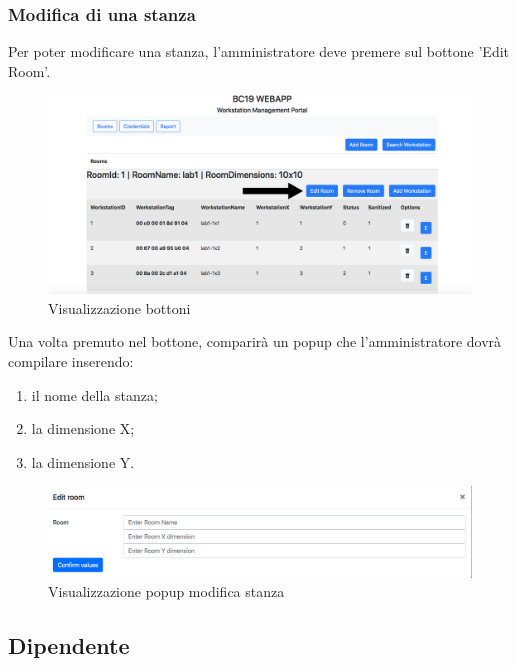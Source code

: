 \subsubsection{Modifica di una stanza}
Per poter modificare una stanza, l'amministratore deve premere sul bottone 'Edit Room'.
\begin{figure}[H]
	\centering
	\includegraphics[width=15cm]{res/images/bottoneEditRoom.png}
	\caption{Visualizzazione bottoni}
\end{figure}
Una volta premuto nel bottone, comparirà un popup che l'amministratore dovrà compilare inserendo:
\begin{enumerate}
\item il nome della stanza;
\item la dimensione X;
\item la dimensione Y.
\end{enumerate}
\begin{figure}[H]
	\centering
	\includegraphics[width=15cm]{res/images/aggiungiStanza1.png}
	\caption{Visualizzazione popup modifica stanza}
\end{figure}

\subsection{Dipendente}


